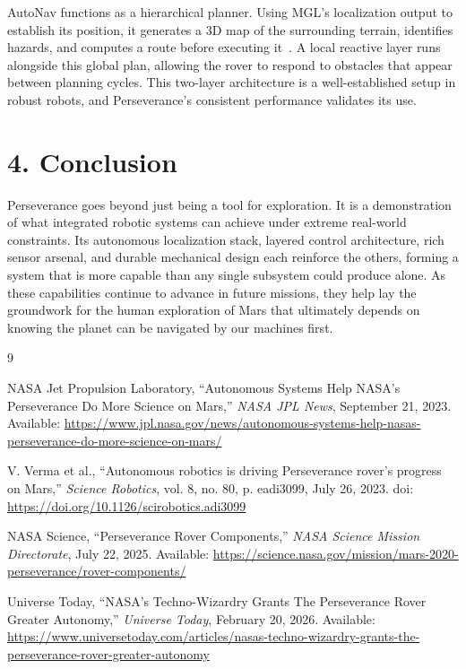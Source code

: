 \documentclass[11pt]{article}
\begin{document}
AutoNav functions as a hierarchical planner. Using MGL's localization output to establish its
position, it generates a 3D map of the surrounding terrain, identifies hazards, and computes a
route before executing it~\cite{autonav_jpl}. A local reactive layer runs alongside this global plan, allowing
the rover to respond to obstacles that appear between planning cycles. This two-layer architecture
is a well-established setup in robust robots, and Perseverance's consistent performance validates its use.

\section*{4. Conclusion}
Perseverance goes beyond just being a tool for exploration. It is a demonstration of what integrated robotic
systems can achieve under extreme real-world constraints. Its autonomous localization stack, layered
control architecture, rich sensor arsenal, and durable mechanical design each reinforce the others,
forming a system that is more capable than any single subsystem could produce alone. As these
capabilities continue to advance in future missions, they help lay the groundwork for the human
exploration of Mars that ultimately depends on knowing the planet can be navigated by our machines first.

\newpage

\begin{thebibliography}{9}

NASA Jet Propulsion Laboratory,
``Autonomous Systems Help NASA's Perseverance Do More Science on Mars,''
\textit{NASA JPL News}, September 21, 2023.
Available: \url{https://www.jpl.nasa.gov/news/autonomous-systems-help-nasas-perseverance-do-more-science-on-mars/}

V. Verma et al.,
``Autonomous robotics is driving Perseverance rover's progress on Mars,''
\textit{Science Robotics}, vol. 8, no. 80, p. eadi3099, July 26, 2023.
doi: \url{https://doi.org/10.1126/scirobotics.adi3099}

NASA Science,
``Perseverance Rover Components,''
\textit{NASA Science Mission Directorate}, July 22, 2025.
Available: \url{https://science.nasa.gov/mission/mars-2020-perseverance/rover-components/}

Universe Today,
``NASA's Techno-Wizardry Grants The Perseverance Rover Greater Autonomy,''
\textit{Universe Today}, February 20, 2026.
Available: \url{https://www.universetoday.com/articles/nasas-techno-wizardry-grants-the-perseverance-rover-greater-autonomy}

\end{thebibliography}
\end{document}
